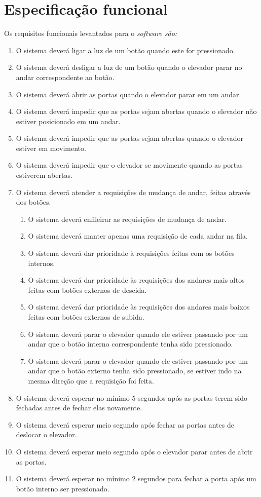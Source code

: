 
\section{Especificação funcional}



Os requisitos funcionais levantados para o \it{software} são:

\begin{enumerate}[label=RF \arabic*. , ref=\arabic*]
	\item O sistema deverá ligar a luz de um botão quando este for pressionado.
  \item O sistema deverá desligar a luz de um botão quando o elevador parar no andar correspondente ao botão.
  \item O sistema deverá abrir as portas quando o elevador parar em um andar.
  \item O sistema deverá impedir que as portas sejam abertas quando o elevador não estiver posicionado em um andar.
  \item O sistema deverá impedir que as portas sejam abertas quando o elevador estiver em movimento.
  \item O sistema deverá impedir que o elevador se movimente quando as portas estiverem abertas.
  \item O sistema deverá atender a requisições de mudança de andar, feitas através dos botões.
  \begin{enumerate}[label*=\arabic*.]
    \item O sistema deverá enfileirar as requisições de mudança de andar.
    \item O sistema deverá manter apenas uma requisição de cada andar na fila.
    \item O sistema deverá dar prioridade à requisições feitas com os botões internos.
    \item O sistema deverá dar prioridade às requisições dos andares mais altos feitas com botões externos de descida.
    \item O sistema deverá dar prioridade às requisições dos andares mais baixos feitas com botões externos de subida.
    \item O sistema deverá parar o elevador quando ele estiver passando por um andar que o botão interno correspondente tenha sido pressionado.
    \item O sistema deverá parar o elevador quando ele estiver passando por um andar que o botão externo tenha sido pressionado, se estiver indo na mesma direção que a requisição foi feita.
    \end{enumerate}
  \item O sistema deverá esperar no mínimo 5 segundos após as portas terem sido fechadas antes de fechar elas novamente.
  \item O sistema deverá esperar meio segundo após fechar as portas antes de deslocar o elevador.
  \item O sistema deverá esperar meio segundo após o elevador parar antes de abrir as portas.
  \item O sistema deverá esperar no mínimo 2 segundos para fechar a porta após um botão interno ser pressionado.
\end{enumerate}

